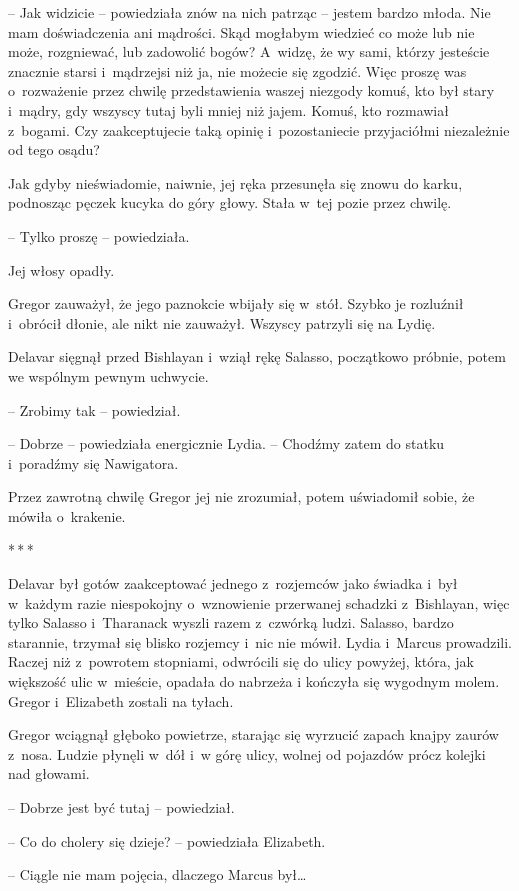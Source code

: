 \documentclass[oneside,polish,12pt,sfheadings]{mwbk}
\newcommand{\threeast}{\bigskip\par\centerline{*\,*\,*}\medskip\par}%
\begin{document}
-- Jak widzicie -- powiedziała znów na nich patrząc -- jestem bardzo młoda.
Nie mam doświadczenia ani mądrości. Skąd mogłabym wiedzieć co może lub
nie może, rozgniewać, lub zadowolić bogów? A~widzę, że wy sami, którzy
jesteście znacznie starsi i~mądrzejsi niż ja, nie możecie się zgodzić.
Więc proszę was o~rozważenie przez chwilę przedstawienia waszej niezgody
komuś, kto był stary i~mądry, gdy wszyscy tutaj byli mniej niż jajem.
Komuś, kto rozmawiał z~bogami. Czy zaakceptujecie taką opinię i~pozostaniecie przyjaciółmi niezależnie od tego osądu?

Jak gdyby nieświadomie, naiwnie, jej ręka przesunęła się znowu do karku,
podnosząc pęczek kucyka do góry głowy. Stała w~tej pozie przez chwilę.

-- Tylko proszę -- powiedziała.

Jej włosy opadły.

Gregor zauważył, że jego paznokcie wbijały się w~stół. Szybko je
rozluźnił i~obrócił dłonie, ale nikt nie zauważył. Wszyscy patrzyli się
na Lydię.

Delavar sięgnął przed Bishlayan i~wziął rękę Salasso, początkowo
próbnie, potem we wspólnym pewnym uchwycie.

-- Zrobimy tak -- powiedział.

-- Dobrze -- powiedziała energicznie Lydia. -- Chodźmy zatem do statku i~poradźmy się Nawigatora.

Przez zawrotną chwilę Gregor jej nie zrozumiał, potem uświadomił sobie,
że mówiła o~krakenie.

\threeast

Delavar był gotów zaakceptować jednego z~rozjemców jako świadka i~był w~każdym razie niespokojny o~wznowienie przerwanej schadzki z~Bishlayan,
więc tylko Salasso i~Tharanack wyszli razem z~czwórką ludzi. Salasso,
bardzo starannie, trzymał się blisko rozjemcy i~nic nie mówił. Lydia i~Marcus prowadzili. Raczej niż z~powrotem stopniami, odwrócili się do
ulicy powyżej, która, jak większość ulic w~mieście, opadała do nabrzeża
i kończyła się wygodnym molem. Gregor i~Elizabeth zostali na tyłach.

Gregor wciągnął głęboko powietrze, starając się wyrzucić zapach knajpy
zaurów z~nosa. Ludzie płynęli w~dół i~w górę ulicy, wolnej od pojazdów
prócz kolejki nad głowami.

-- Dobrze jest być tutaj -- powiedział.

-- Co do cholery się dzieje? -- powiedziała Elizabeth.

-- Ciągle nie mam pojęcia, dlaczego Marcus był\ldots
\end{document}
